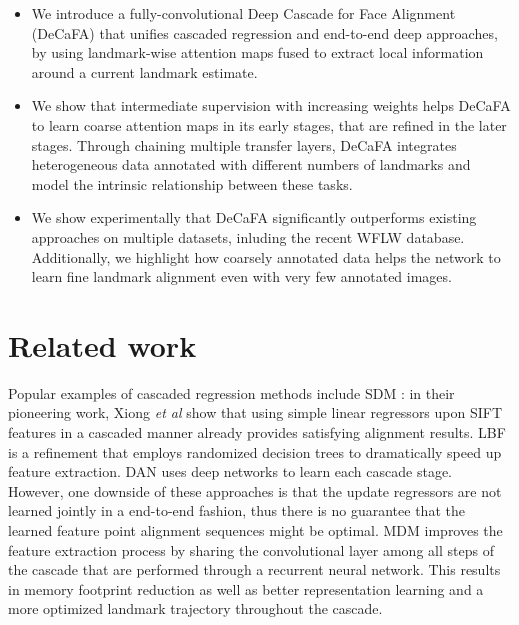 \documentclass[10pt,twocolumn,letterpaper]{article}
\begin{document}
\begin{itemize}
	\item We introduce a fully-convolutional Deep Cascade for Face Alignment (DeCaFA) that unifies cascaded regression and end-to-end deep approaches, by using landmark-wise attention maps fused to extract local information around a current landmark estimate.
	
	\item We show that intermediate supervision with increasing weights helps DeCaFA to learn coarse attention maps in its early stages, that are refined in the later stages. Through chaining multiple transfer layers, DeCaFA integrates heterogeneous data annotated with different numbers of landmarks and model the intrinsic relationship between these tasks.
	
    \item We show experimentally that DeCaFA significantly outperforms existing approaches on multiple datasets, inluding the recent WFLW database. Additionally, we highlight how coarsely annotated data helps the network to learn fine landmark alignment even with very few annotated images.
\end{itemize}

\section{Related work}

Popular examples of cascaded regression methods include SDM \cite{Xiong2013}: in their pioneering work, Xiong \textit{et al} show that using simple linear regressors upon SIFT features in a cascaded manner already provides satisfying alignment results. LBF \cite{Ren2014} is a refinement that employs randomized decision trees to dramatically speed up feature extraction. DAN \cite{kowalski2017deep} uses deep networks to learn each cascade stage. However, one downside of these approaches is that the update regressors are not learned jointly in a end-to-end fashion, thus there is no guarantee that the learned feature point alignment sequences might be optimal. MDM \cite{Trigeorgis2016} improves the feature extraction process by sharing the convolutional layer among all steps of the cascade that are performed through a recurrent neural network. This results in memory footprint reduction as well as better representation learning and a more optimized landmark trajectory throughout the cascade.
\end{document}

